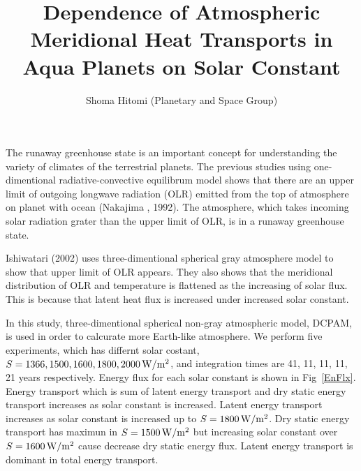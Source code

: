 \documentclass[
	paper=A4,
	tbtags,
	DVI=14,
]{scrartcl}
\title{Dependence of Atmospheric Meridional Heat Transports in Aqua Planets on Solar Constant}
\author{Shoma Hitomi (Planetary and Space Group)}
\date{}
\begin{document}
\maketitle

The runaway greenhouse state is an important concept for understanding the variety
of climates of the terrestrial planets.
The previous studies using one-dimentional radiative-convective equilibrum model
shows that there are an upper limit of outgoing longwave radiation (OLR) emitted
from the top of atmosphere on planet with ocean (Nakajima \etal*, 1992).
The atmosphere, which takes incoming solar radiation grater than the upper limit
of OLR, is in a runaway greenhouse state.

Ishiwatari \etal (2002) uses three-dimentional spherical gray atmosphere model
to show that upper limit of OLR appears.
They also shows that the meridional distribution of OLR and temperature is flattened
as the increasing of solar flux.
This is because that latent heat flux is increased under increased solar constant.

In this study, three-dimentional spherical non-gray atmospheric model, DCPAM, is used
in order to calcurate more Earth-like atmosphere.
We perform five experiments, which has differnt solar costant,
\(S=1366, 1500, 1600, 1800, 2000\hmu{W/m^2}\), and integration times are 
41, 11, 11, 11, 21 years respectively.
Energy flux for each solar constant is shown in Fig~\ref{EnFlx}.
Energy transport which is sum of latent energy transport and dry static energy transport increases
as solar constant is increased.
Latent energy transport increases as solar constant is increased up to \(S=1800\hmu{W/m^2}\).
Dry static energy transport has maximun in \(S=1500\hmu{W/m^2}\) but increasing solar constant
over \(S=1600\hmu{W/m^2}\) cause decrease dry static energy flux.
Latent energy transport is dominant in total energy transport.
\end{document}
